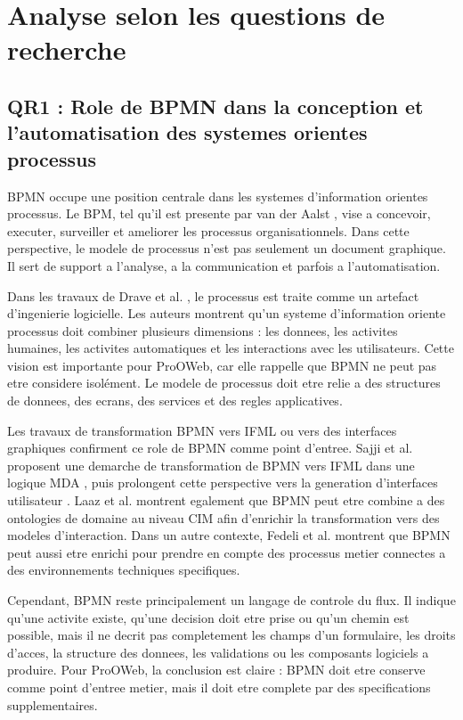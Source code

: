 \documentclass[12pt,a4paper]{article}
\begin{document}
\section{Analyse selon les questions de recherche}

\subsection{QR1 : Role de BPMN dans la conception et l'automatisation des systemes orientes processus}

BPMN occupe une position centrale dans les systemes d'information orientes processus. Le BPM, tel qu'il est presente par van der Aalst \cite{aalst2013}, vise a concevoir, executer, surveiller et ameliorer les processus organisationnels. Dans cette perspective, le modele de processus n'est pas seulement un document graphique. Il sert de support a l'analyse, a la communication et parfois a l'automatisation.

Dans les travaux de Drave et al. \cite{drave2022}, le processus est traite comme un artefact d'ingenierie logicielle. Les auteurs montrent qu'un systeme d'information oriente processus doit combiner plusieurs dimensions : les donnees, les activites humaines, les activites automatiques et les interactions avec les utilisateurs. Cette vision est importante pour ProOWeb, car elle rappelle que BPMN ne peut pas etre considere isolément. Le modele de processus doit etre relie a des structures de donnees, des ecrans, des services et des regles applicatives.

Les travaux de transformation BPMN vers IFML ou vers des interfaces graphiques confirment ce role de BPMN comme point d'entree. Sajji et al. proposent une demarche de transformation de BPMN vers IFML dans une logique MDA \cite{sajji2022}, puis prolongent cette perspective vers la generation d'interfaces utilisateur \cite{sajji2023}. Laaz et al. \cite{laaz2020} montrent egalement que BPMN peut etre combine a des ontologies de domaine au niveau CIM afin d'enrichir la transformation vers des modeles d'interaction. Dans un autre contexte, Fedeli et al. \cite{fedeli2024} montrent que BPMN peut aussi etre enrichi pour prendre en compte des processus metier connectes a des environnements techniques specifiques.

Cependant, BPMN reste principalement un langage de controle du flux. Il indique qu'une activite existe, qu'une decision doit etre prise ou qu'un chemin est possible, mais il ne decrit pas completement les champs d'un formulaire, les droits d'acces, la structure des donnees, les validations ou les composants logiciels a produire. Pour ProOWeb, la conclusion est claire : BPMN doit etre conserve comme point d'entree metier, mais il doit etre complete par des specifications supplementaires.
\end{document}
